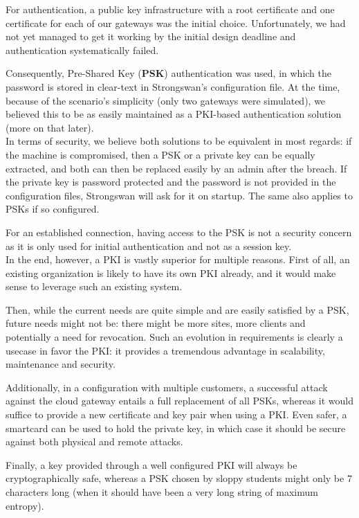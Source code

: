 \documentclass[paper=a4, fontsize=11pt]{scrartcl}
\begin{document}
For authentication, a public key infrastructure with a root certificate and one
certificate for each of our gateways was the initial choice.
Unfortunately, we had not yet managed to get it working by the initial design
deadline and authentication systematically failed.

Consequently, Pre-Shared Key (\textbf{PSK}) authentication was used, in which the
password is stored in clear-text in Strongswan's configuration file.
At the time, because of the scenario's simplicity (only two gateways were
simulated), we believed this to be as easily maintained as a
PKI-based authentication solution (more on that later).\\

In terms of security, we believe both solutions to be equivalent in most
regards: if the machine is compromised, then a PSK or a private key can be
equally extracted, and both can then be replaced easily by an admin after the
breach. 
If the private key is password protected and the password is not provided in the
configuration files, Strongswan will ask for it on startup.
The same also applies to PSKs if so configured.

For an established connection, having access to the PSK is not a security
concern as it is only used for initial authentication and not as a session key.\\

In the end, however, a PKI is vastly superior for multiple reasons.
First of all, an existing organization is likely to have its own PKI already,
and it would make sense to leverage such an existing system.

Then, while the current needs are quite simple and are easily satisfied by a
PSK, future needs might not be: there might be more sites, more clients and
potentially a need for revocation.
Such an evolution in requirements is clearly a usecase in favor the PKI\@: it
provides a tremendous advantage in scalability, maintenance and security.

Additionally, in a configuration with multiple customers, a successful attack
against the cloud gateway entails a full replacement of all PSKs, whereas it
would suffice to provide a new certificate and key pair when using a PKI\@.
Even safer, a smartcard can be used to hold the private key, in which case it
should be secure against both physical and remote attacks.

Finally, a key provided through a well configured PKI will always be
cryptographically safe, whereas a PSK chosen by sloppy students might only be 7
characters long (when it should have been a very long string of maximum
entropy).
\end{document}
